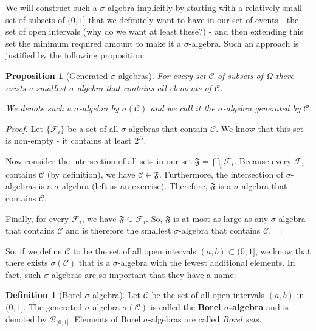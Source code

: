\documentclass{book}
\theoremstyle{plain}%
\newtheorem{proposition}{Proposition}[section]
\theoremstyle{definition}
\newtheorem{definition}{Definition}[section]
\begin{document}
We will construct such a $\sigma$-algebra implicitly by starting with a relatively small set of subsets of $(0, 1]$ that we definitely want to have in our set of events - the set of open intervals (why do we want at least these?) - and then extending this set the minimum required amount to make it a $\sigma$-algebra. Such an approach is justified by the following proposition:

\begin{proposition}[Generated $\sigma$-algebras]
For every set $\mathcal{C}$ of subsets of $\Omega$ there exists a smallest $\sigma$-algebra that contains all elements of $\mathcal{C}$.

We denote such a $\sigma$-algebra by $\sigma(\mathcal{C})$ and we call it the $\sigma$-algebra generated by $\mathcal{C}$.\label{prop:generated_algebras}
\end{proposition}

\begin{proof}
Let $\{\mathcal{F}_i\}$ be a set of all $\sigma$-algebras that contain $\mathcal{C}$. We know that this set is non-empty - it contains at least $2^{{\Omega}}$.

Now consider the intersection of all sets in our set $\mathfrak{F} = \bigcap_{i} \mathcal{F}_i$. Because every $\mathcal{F}_i$ contains $\mathcal{C}$ (by definition), we have $\mathcal{C} \in \mathfrak{F}$. Furthermore, the intersection of $\sigma$-algebras is a $\sigma$-algebra (left as an exercise). Therefore, $\mathfrak{F}$ is a $\sigma$-algebra that contains $\mathcal{C}$.

Finally, for every $\mathcal{F}_i$, we have $\mathfrak{F} \subseteq \mathcal{F}_i$. So, $\mathfrak{F}$ is at most as large as any $\sigma$-algebra that contains $\mathcal{C}$ and is therefore the smallest $\sigma$-algebra that contains $\mathcal{C}$.
\end{proof}

So, if we define $\mathcal{C}$ to be the set of all open intervals $(a,b) \subset (0,1]$, we know that there exists $\sigma(\mathcal{C})$ that is a $\sigma$-algebra with the fewest additional elements. In fact, such $\sigma$-algebras are so important that they have a name:

\begin{definition}[Borel $\sigma$-algebra] Let $\mathcal{C}$ be the set of all open intervals $(a, b)$ in $(0,1]$. The generated $\sigma$-algebra $\sigma(\mathcal{C})$ is called the \textbf{Borel $\sigma$-algebra} and is denoted by $\mathcal{B}_{(0,1]}$. Elements of Borel $\sigma$-algebras are called \emph{Borel sets.}
\end{definition}
\end{document}
